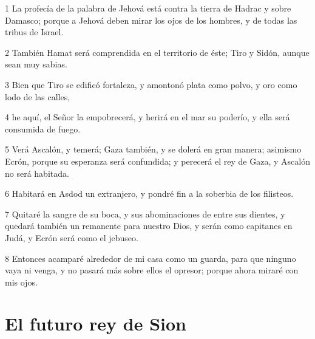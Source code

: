 \par 1 La profecía de la palabra de Jehová está contra la tierra de Hadrac y sobre Damasco; porque a Jehová deben mirar los ojos de los hombres, y de todas las tribus de Israel.
\par 2 También Hamat será comprendida en el territorio de éste; Tiro y Sidón, aunque sean muy sabias.
\par 3 Bien que Tiro se edificó fortaleza, y amontonó plata como polvo, y oro como lodo de las calles,
\par 4 he aquí, el Señor la empobrecerá, y herirá en el mar su poderío, y ella será consumida de fuego.
\par 5 Verá Ascalón, y temerá; Gaza también, y se dolerá en gran manera; asimismo Ecrón, porque su esperanza será confundida; y perecerá el rey de Gaza, y Ascalón no será habitada.
\par 6 Habitará en Asdod un extranjero, y pondré fin a la soberbia de los filisteos. 
\par 7 Quitaré la sangre de su boca, y sus abominaciones de entre sus dientes, y quedará también un remanente para nuestro Dios, y serán como capitanes en Judá, y Ecrón será como el jebuseo.
\par 8 Entonces acamparé alrededor de mi casa como un guarda, para que ninguno vaya ni venga, y no pasará más sobre ellos el opresor; porque ahora miraré con mis ojos.

\section*{El futuro rey de Sion}

